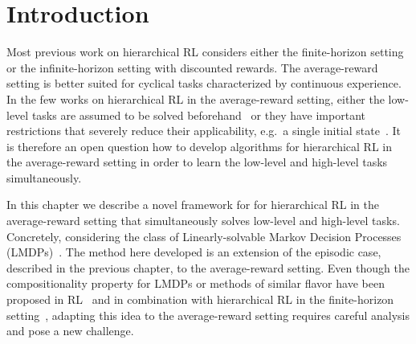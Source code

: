 \section{Introduction}

Most previous work on hierarchical RL considers either the finite-horizon setting or the infinite-horizon setting with discounted rewards.
The average-reward setting is better suited for cyclical tasks characterized by continuous experience.
In the few works on hierarchical RL in the average-reward setting, either the low-level tasks are assumed to be solved beforehand~\citep{Fruit2017,Fruit2017b,Wan2021a} or they %
have important restrictions that severely reduce their applicability, e.g.~a single initial state~\citep{Ghavamzadeh2007}. It is therefore an open question how to develop algorithms for hierarchical RL in the average-reward setting
in order to learn the low-level and high-level tasks simultaneously.



In this chapter we describe a novel framework for for hierarchical RL in the average-reward setting that simultaneously solves low-level and high-level tasks. Concretely, considering the class of Linearly-solvable Markov Decision Processes (LMDPs)~\citep{Todorov2006}. The method here developed is an extension of the episodic case, described in the previous chapter, to the average-reward setting. Even though the compositionality property for LMDPs or methods of similar flavor have been proposed in RL~\cite{Hunt2019,Niekerk2019,NangueTasse2020} and in combination with hierarchical RL in the finite-horizon setting~\cite{Jonsson2016,Saxe2017,Infante2022}, adapting this idea to the average-reward setting requires careful analysis and pose a new challenge.





